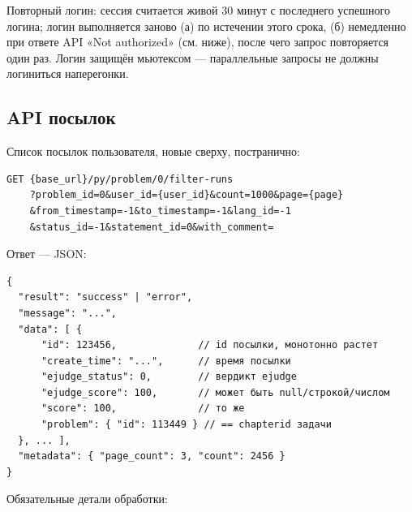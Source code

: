 \documentclass[12pt,a4paper]{article}
\begin{document}
Повторный логин: сессия считается живой 30 минут с последнего успешного
логина; логин выполняется заново (а) по истечении этого срока, (б) немедленно
при ответе API «Not authorized» (см. ниже), после чего запрос повторяется
один раз. Логин защищён мьютексом --- параллельные запросы не должны
логиниться наперегонки.

\subsection{API посылок}
\label{sec:runsapi}

Список посылок пользователя, новые сверху, постранично:

\begin{small}\begin{verbatim}
GET {base_url}/py/problem/0/filter-runs
    ?problem_id=0&user_id={user_id}&count=1000&page={page}
    &from_timestamp=-1&to_timestamp=-1&lang_id=-1
    &status_id=-1&statement_id=0&with_comment=
\end{verbatim}\end{small}

Ответ --- JSON:

\begin{small}\begin{verbatim}
{
  "result": "success" | "error",
  "message": "...",
  "data": [ {
      "id": 123456,              // id посылки, монотонно растет
      "create_time": "...",      // время посылки
      "ejudge_status": 0,        // вердикт ejudge
      "ejudge_score": 100,       // может быть null/строкой/числом
      "score": 100,              // то же
      "problem": { "id": 113449 } // == chapterid задачи
  }, ... ],
  "metadata": { "page_count": 3, "count": 2456 }
}
\end{verbatim}\end{small}

Обязательные детали обработки:
\end{document}
